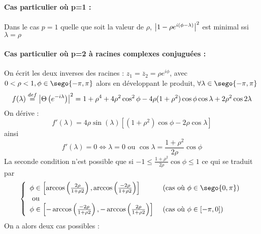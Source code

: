 \documentclass{report}
\begin{document}
\paragraph{Cas particulier où p=1 :}
Dans le cas $p=1$ quelle que soit la valeur de $\rho$, ${ \left| 1-\rho e^{i(\phi-\lambda)} \right|}^2$ est minimal ssi $\lambda = \rho$

\paragraph{Cas particulier où p=2 à racines complexes conjuguées :}
On écrit les deux inverses des racines : $z_1=\overline{z}_2 = \rho e^{i\phi}$, avec $0<\rho<1, \phi \in \sego{-\pi,\pi}$ alors en développant le produit, $\forall \lambda \in \sego{-\pi,\pi}$
$$
f(\lambda) \stackrel{def}{=} { \left| \Theta\left( e^{-i\lambda}\right) \right|}^2 = 1 + \rho^4 + 4\rho^2 \cos^2{\phi} - 4\rho(1+\rho^2)\cos{\phi} \cos{\lambda} + 2\rho^2\cos{2\lambda}
$$
On dérive :
$$
f'(\lambda) = 4\rho \sin(\lambda) \left[ (1+\rho^2) \cos{\phi} - 2\rho \cos{\lambda} \right]
$$
ainsi 
$$
f'(\lambda)=0 \iff \lambda = 0 \mbox{ ou } \cos{\lambda} = \frac{1+\rho^2}{2\rho} \cos{\phi}
$$
La seconde condition n'est possible que si $ -1\leq \frac{1+\rho^2}{2\rho} \cos{\phi} \leq 1$ ce qui se traduit par 
\begin{equation}\label{eq:phaseAR2}
\piecewise{
\phi \in \seg{\arccos\left( \frac{2\rho}{1+\rho2} \right), \arccos\left( \frac{-2\rho}{1+\rho2} \right)} & \mbox{ (cas où $\phi \in \sego{0,\pi}$)} \\
\mbox{ ou } & \\
\phi \in \seg{-\arccos\left( \frac{-2\rho}{1+\rho2} \right), -\arccos\left( \frac{2\rho}{1+\rho2} \right)} & \mbox{ (cas où $\phi \in \seg{-\pi,0}$)} \\
}
\end{equation}
On a alors deux cas possibles :
\end{document}
